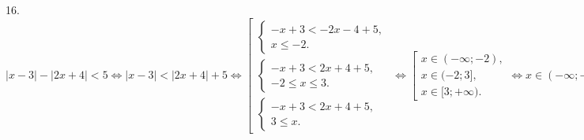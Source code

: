 16. $|x-3|-|2x+4|<5\Leftrightarrow |x-3|<|2x+4|+5 \Leftrightarrow \left[\begin{array}{l}\begin{cases} -x+3<-2x-4+5,\\ x\leqslant -2.\end{cases}\\
\begin{cases} -x+3<2x+4+5,\\ -2\leqslant x\leqslant 3 .\end{cases}\\\begin{cases} -x+3<2x+4+5,\\ 3\leqslant x.\end{cases}\end{array}\right.\Leftrightarrow
\left[\begin{array}{l}
x\in(-\infty;-2),\\
x\in(-2;3],\\
x\in[3;+\infty).\end{array}\right.\Leftrightarrow x\in(-\infty;-2)\cup(-2;+\infty)$\\
